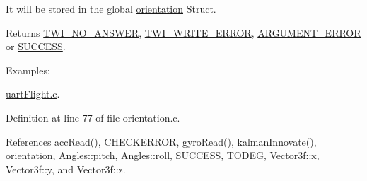 It will be stored in the global \hyperlink{group__orientation_gacd4a2942520b68691db5aebde4e537a4}{orientation} Struct. \begin{DoxyReturn}{Returns}
\hyperlink{group__error_gga2c3e4bb40f36b262a5214e2da2bca9c5a04d5943ba652af2205c88b247e0c659c}{T\-W\-I\-\_\-\-N\-O\-\_\-\-A\-N\-S\-W\-E\-R}, \hyperlink{group__error_gga2c3e4bb40f36b262a5214e2da2bca9c5ac0e3b3463dcaf220e54794b4711708c9}{T\-W\-I\-\_\-\-W\-R\-I\-T\-E\-\_\-\-E\-R\-R\-O\-R}, \hyperlink{group__error_gga2c3e4bb40f36b262a5214e2da2bca9c5a49ccf277a69dd938c591928aa27c66cc}{A\-R\-G\-U\-M\-E\-N\-T\-\_\-\-E\-R\-R\-O\-R} or \hyperlink{group__error_gga2c3e4bb40f36b262a5214e2da2bca9c5ac7f69f7c9e5aea9b8f54cf02870e2bf8}{S\-U\-C\-C\-E\-S\-S}. 
\end{DoxyReturn}
\begin{Desc}
\item[Examples\-: ]\par
\hyperlink{uart_flight_8c-example}{uart\-Flight.\-c}.\end{Desc}


Definition at line 77 of file orientation.\-c.



References acc\-Read(), C\-H\-E\-C\-K\-E\-R\-R\-O\-R, gyro\-Read(), kalman\-Innovate(), orientation, Angles\-::pitch, Angles\-::roll, S\-U\-C\-C\-E\-S\-S, T\-O\-D\-E\-G, Vector3f\-::x, Vector3f\-::y, and Vector3f\-::z.


